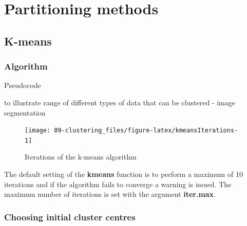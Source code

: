 \documentclass[]{book}
\theoremstyle{definition}
\theoremstyle{definition}
\theoremstyle{definition}
\theoremstyle{remark}
\begin{document}
\section{Partitioning methods}\label{partitioning-methods}

\subsection{K-means}\label{k-means}

\subsubsection{Algorithm}\label{algorithm}

Pseudocode

to illustrate range of different types of data that can be clustered -
image segmentation

\begin{figure}

{\centering \texttt{[image: 09-clustering\_files/figure-latex/kmeansIterations-1]} 

}

\caption{Iterations of the k-means algorithm}\label{fig:kmeansIterations}
\end{figure}

The default setting of the \textbf{kmeans} function is to perform a
maximum of 10 iterations and if the algorithm fails to converge a
warning is issued. The maximum number of iterations is set with the
argument \textbf{iter.max}.

\subsubsection{Choosing initial cluster
centres}\label{choosing-initial-cluster-centres}
\end{document}
